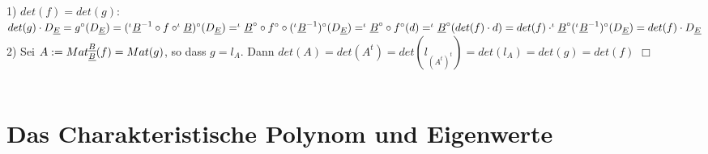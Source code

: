 \documentclass[fleqn, a4paper, 11pt]{scrartcl}
\theoremstyle{definition}
\begin{document}
1) $det(f)=det(g)$: $det(g)\cdot D_{\uline{E}}=g^{\circ}(D_{\uline{E}})=(^{\iota}\uline{B}^{-1}\circ f\circ ^{\iota}\uline{B})^{\circ}(D_{\uline{E}})=^{\iota}\uline{B}^{\circ}\circ f^{\circ} \circ (^{\iota}\uline{B}^{-1})^{\circ}(D_{\uline{E}})=^{\iota}\uline{B}^{\circ} \circ f^{\circ}(d)=^{\iota}\uline{B}^{\circ}(det(f)\cdot d)=det(f)\cdot ^{\iota}\uline{B}^{\circ}(^{\iota}\uline{B}^{-1})^{\circ}(D_{\uline{E}})=det(f)\cdot D_{\uline{E}}$\\
2) Sei $A:=Mat_{\uline{B}}^{\uline{B}}(f)=Mat(g)$, so dass $g=l_A$. Dann $det(A)=det(A^t)=det(l_{(A^t)^t})=det(l_A)=det(g)=det(f)$ \hfill $\Box$\\
\\
\newpage
\section{Das Charakteristische Polynom und Eigenwerte}
\end{document}
